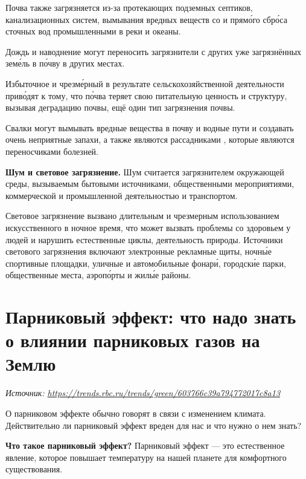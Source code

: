 Почва также загрязняется из-за протекающих подземных септиков, канализационных систем, вымывания вредных веществ со  и прям\'{о}го сбр\'{о}са сточных вод промышленными  в реки и океаны.

Дождь и наводнение могут переносить загрязнители с других уже загрязнённых зем\'{е}ль в п\'{о}чву в других местах.

Избыточное  и чрезм\'{е}рный  в результате сельскохозяйственной деятельности прив\'{о}дят к тому, что п\'{о}чва теряет свою питательную ценность и структуру, вызывая деградацию почвы, ещё один тип загрязнения почвы.

Свалки могут вымывать вредные вещества в почву и водные пути и создавать очень неприятные запахи, а также являются рассадниками , которые являются переносчиками болезней.

\textbf{Шум и световое загрязнение.}
Шум считается загрязнителем окружающей среды, вызываемым бытовыми источниками, общественными мероприятиями, коммерческой и промышленной деятельностью и транспортом.

Световое загрязнение вызвано длительным и чрезмерным использованием искусственного  в ночное время, что может вызвать проблемы со здоровьем у людей и нарушить естественные циклы,  деятельность  природы. Источники светового загрязнения включают электронные рекламные щиты, ночн\'{ы}е спортивные площадки, уличные и автомобильные фонар\'{и}, городск\'{и}е парки, общественные места, аэроп\'{о}рты и жил\'{ы}е районы.

\newpage
\section[Парниковый эффект]{Парниковый эффект: что надо знать о влиянии парниковых газов на Землю}

\textit{Источник: \url{https://trends.rbc.ru/trends/green/603766c39a794772017c8a13}}

О парниковом эффекте обычно говорят в связи с изменением климата. Действительно ли парниковый эффект вреден для нас и что нужно о нем знать?

\textbf{Что такое парниковый эффект?}
Парниковый эффект — это естественное явление, которое повышает температуру на нашей планете для комфортного существования.

